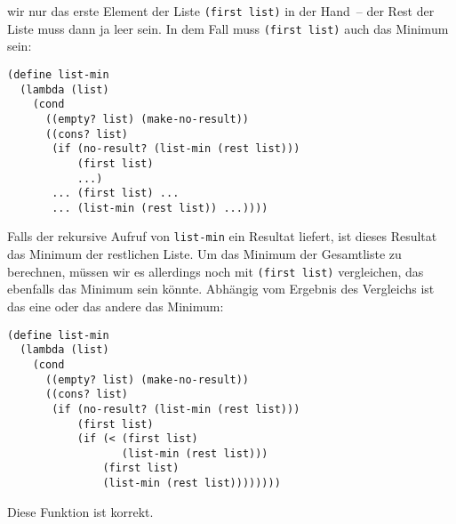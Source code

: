 wir nur das erste Element der Liste \lstinline{(first list)} in der
Hand~-- der Rest der Liste muss dann ja leer sein.  In dem Fall muss
\lstinline{(first list)} auch das Minimum sein:
%
\begin{lstlisting}
(define list-min
  (lambda (list)
    (cond
      ((empty? list) (make-no-result))
      ((cons? list)
       (if (no-result? (list-min (rest list)))
           (first list)
           ...)
       ... (first list) ...
       ... (list-min (rest list)) ...))))
\end{lstlisting}
%
Falls der rekursive Aufruf von \lstinline{list-min} ein Resultat
liefert, ist dieses Resultat das Minimum der restlichen Liste.
Um das Minimum der Gesamtliste zu berechnen, müssen wir es allerdings
noch mit \lstinline{(first list)} vergleichen, das ebenfalls das
Minimum sein könnte.  Abhängig vom Ergebnis des Vergleichs ist das
eine oder das andere das Minimum:
%
\begin{lstlisting}
(define list-min
  (lambda (list)
    (cond
      ((empty? list) (make-no-result))
      ((cons? list)
       (if (no-result? (list-min (rest list)))
           (first list)
           (if (< (first list)
                  (list-min (rest list)))
               (first list)
               (list-min (rest list))))))))
\end{lstlisting}
%
Diese Funktion ist korrekt.

